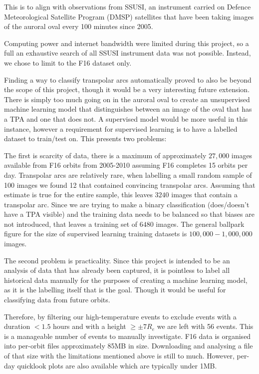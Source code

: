 \documentclass[12pt]{article}
\begin{document}
This is to align with observations from SSUSI, an instrument carried on Defence Meteorological Satellite Program (DMSP) satellites that have been taking images of the auroral oval every 100 minutes since 2005. 

Computing power and internet bandwidth were limited during this project, so a full an exhaustive search of all SSUSI instrument data was not possible. Instead, we chose to limit to the F16 dataset only.

Finding a way to classify transpolar arcs automatically proved to also be beyond the scope of this project, though it would be a very interesting future extension. There is simply too much going on in the auroral oval to create an unsupervised machine learning model that distinguishes between an image of the oval that has a TPA and one that does not. A supervised model would be more useful in this instance, however a requirement for supervised learning is to have a labelled dataset to train/test on. This presents two problems:

The first is scarcity of data, there is a maximum of approximately $27,000$ images available from F16 orbits from 2005-2010 assuming F16 completes 15 orbits per day. Transpolar arcs are relatively rare, when labelling a small random sample of 100 images we found 12 that contained convincing transpolar arcs. Assuming that estimate is true for the entire sample, this leaves $3240$ images that contain a transpolar arc. Since we are trying to make a binary classification (does/doesn't have a TPA visible) and the training data needs to be balanced so that biases are not introduced, that leaves a training set of $6480$ images. The general ballpark figure for the size of supervised learning training datasets is $100,000-1,000,000$ images.

The second problem is practicality. Since this project is intended to be an analysis of data that has already been captured, it is pointless to label all historical data manually for the purposes of creating a machine learning model, as it is the labelling itself that is the goal. Though it would be useful for classifying data from future orbits.

Therefore, by filtering our high-temperature events to exclude events with a duration $< 1.5$ hours and with a height $\ge\pm7R_e$ we are left with 56 events. This is a manageable number of events to manually investigate. F16 data is organised into per-orbit files approximately 85MB in size. Downloading and analysing a file of that size with the limitations mentioned above is still to much. However, per-day quicklook plots are also available which are typically under 1MB. 
\end{document}
